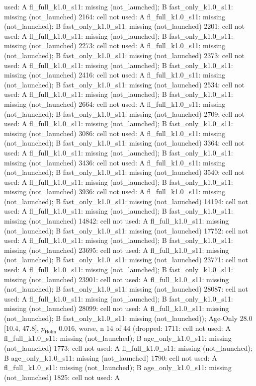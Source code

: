 \begin{table}[t]
{used: A fl\_full\_k1.0\_s11: missing (not\_launched); B fast\_only\_k1.0\_s11: missing (not\_launched) \textbar{} 2164: cell not used: A fl\_full\_k1.0\_s11: missing (not\_launched); B fast\_only\_k1.0\_s11: missing (not\_launched) \textbar{} 2201: cell not used: A fl\_full\_k1.0\_s11: missing (not\_launched); B fast\_only\_k1.0\_s11: missing (not\_launched) \textbar{} 2273: cell not used: A fl\_full\_k1.0\_s11: missing (not\_launched); B fast\_only\_k1.0\_s11: missing (not\_launched) \textbar{} 2373: cell not used: A fl\_full\_k1.0\_s11: missing (not\_launched); B fast\_only\_k1.0\_s11: missing (not\_launched) \textbar{} 2416: cell not used: A fl\_full\_k1.0\_s11: missing (not\_launched); B fast\_only\_k1.0\_s11: missing (not\_launched) \textbar{} 2534: cell not used: A fl\_full\_k1.0\_s11: missing (not\_launched); B fast\_only\_k1.0\_s11: missing (not\_launched) \textbar{} 2664: cell not used: A fl\_full\_k1.0\_s11: missing (not\_launched); B fast\_only\_k1.0\_s11: missing (not\_launched) \textbar{} 2709: cell not used: A fl\_full\_k1.0\_s11: missing (not\_launched); B fast\_only\_k1.0\_s11: missing (not\_launched) \textbar{} 3086: cell not used: A fl\_full\_k1.0\_s11: missing (not\_launched); B fast\_only\_k1.0\_s11: missing (not\_launched) \textbar{} 3364: cell not used: A fl\_full\_k1.0\_s11: missing (not\_launched); B fast\_only\_k1.0\_s11: missing (not\_launched) \textbar{} 3436: cell not used: A fl\_full\_k1.0\_s11: missing (not\_launched); B fast\_only\_k1.0\_s11: missing (not\_launched) \textbar{} 3540: cell not used: A fl\_full\_k1.0\_s11: missing (not\_launched); B fast\_only\_k1.0\_s11: missing (not\_launched) \textbar{} 3936: cell not used: A fl\_full\_k1.0\_s11: missing (not\_launched); B fast\_only\_k1.0\_s11: missing (not\_launched) \textbar{} 14194: cell not used: A fl\_full\_k1.0\_s11: missing (not\_launched); B fast\_only\_k1.0\_s11: missing (not\_launched) \textbar{} 14842: cell not used: A fl\_full\_k1.0\_s11: missing (not\_launched); B fast\_only\_k1.0\_s11: missing (not\_launched) \textbar{} 17752: cell not used: A fl\_full\_k1.0\_s11: missing (not\_launched); B fast\_only\_k1.0\_s11: missing (not\_launched) \textbar{} 23695: cell not used: A fl\_full\_k1.0\_s11: missing (not\_launched); B fast\_only\_k1.0\_s11: missing (not\_launched) \textbar{} 23771: cell not used: A fl\_full\_k1.0\_s11: missing (not\_launched); B fast\_only\_k1.0\_s11: missing (not\_launched) \textbar{} 23901: cell not used: A fl\_full\_k1.0\_s11: missing (not\_launched); B fast\_only\_k1.0\_s11: missing (not\_launched) \textbar{} 28087: cell not used: A fl\_full\_k1.0\_s11: missing (not\_launched); B fast\_only\_k1.0\_s11: missing (not\_launched) \textbar{} 28099: cell not used: A fl\_full\_k1.0\_s11: missing (not\_launched); B fast\_only\_k1.0\_s11: missing (not\_launched)); Age-Only 28.0 [10.4, 47.8], $p_\mathrm{Holm}$ 0.016, worse, n 14 of 44 (dropped: 1711: cell not used: A fl\_full\_k1.0\_s11: missing (not\_launched); B age\_only\_k1.0\_s11: missing (not\_launched) \textbar{} 1773: cell not used: A fl\_full\_k1.0\_s11: missing (not\_launched); B age\_only\_k1.0\_s11: missing (not\_launched) \textbar{} 1790: cell not used: A fl\_full\_k1.0\_s11: missing (not\_launched); B age\_only\_k1.0\_s11: missing (not\_launched) \textbar{} 1825: cell not used: A }
\end{table}
